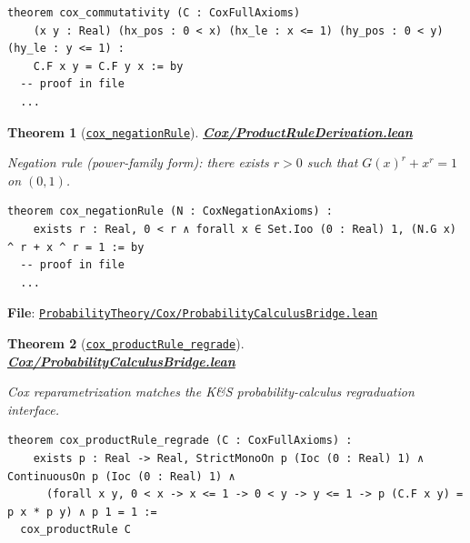 \documentclass[11pt]{article}
\newtheorem{theorem}{Theorem}[section]
\theoremstyle{definition}
\theoremstyle{remark}
\begin{document}
\begin{lstlisting}[caption={Cox commutativity derived from multiplicative representation}]
theorem cox_commutativity (C : CoxFullAxioms)
    (x y : Real) (hx_pos : 0 < x) (hx_le : x <= 1) (hy_pos : 0 < y) (hy_le : y <= 1) :
    C.F x y = C.F y x := by
  -- proof in file
  ...
\end{lstlisting}

\begin{theorem}[\href{https://github.com/zariuq/ks-foundations-of-inference/blob/main/ProbabilityTheory/Cox/ProductRuleDerivation.lean}{\texttt{cox\_negationRule}}]
\textbf{\href{https://github.com/zariuq/ks-foundations-of-inference/blob/main/ProbabilityTheory/Cox/ProductRuleDerivation.lean}{Cox/ProductRuleDerivation.lean}}

Negation rule (power-family form): there exists $r>0$ such that $G(x)^r + x^r = 1$ on $(0,1)$.
\end{theorem}

\begin{lstlisting}[caption={Cox negation rule: power-family form}]
theorem cox_negationRule (N : CoxNegationAxioms) :
    exists r : Real, 0 < r ∧ forall x ∈ Set.Ioo (0 : Real) 1, (N.G x) ^ r + x ^ r = 1 := by
  -- proof in file
  ...
\end{lstlisting}

\textbf{File}: \href{https://github.com/zariuq/ks-foundations-of-inference/blob/main/ProbabilityTheory/Cox/ProbabilityCalculusBridge.lean}{\texttt{ProbabilityTheory/Cox/ProbabilityCalculusBridge.lean}}

\begin{theorem}[\href{https://github.com/zariuq/ks-foundations-of-inference/blob/main/ProbabilityTheory/Cox/ProbabilityCalculusBridge.lean}{\texttt{cox\_productRule\_regrade}}]
\textbf{\href{https://github.com/zariuq/ks-foundations-of-inference/blob/main/ProbabilityTheory/Cox/ProbabilityCalculusBridge.lean}{Cox/ProbabilityCalculusBridge.lean}}

Cox reparametrization matches the K\&S probability-calculus regraduation interface.
\end{theorem}

\begin{lstlisting}[caption={Bridge: Cox product rule as a K\&S-style regrade}]
theorem cox_productRule_regrade (C : CoxFullAxioms) :
    exists p : Real -> Real, StrictMonoOn p (Ioc (0 : Real) 1) ∧ ContinuousOn p (Ioc (0 : Real) 1) ∧
      (forall x y, 0 < x -> x <= 1 -> 0 < y -> y <= 1 -> p (C.F x y) = p x * p y) ∧ p 1 = 1 :=
  cox_productRule C
\end{lstlisting}
\end{document}

